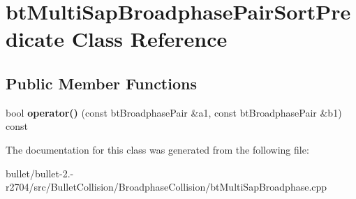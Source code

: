 \hypertarget{classbt_multi_sap_broadphase_pair_sort_predicate}{\section{bt\+Multi\+Sap\+Broadphase\+Pair\+Sort\+Predicate Class Reference}
\label{classbt_multi_sap_broadphase_pair_sort_predicate}
}
\subsection*{Public Member Functions}
\begin{DoxyCompactItemize}
\item 
\hypertarget{classbt_multi_sap_broadphase_pair_sort_predicate_ae034779b942c257b596baff0543bbf5d}{bool {\bfseries operator()} (const bt\+Broadphase\+Pair \&a1, const bt\+Broadphase\+Pair \&b1) const }\label{classbt_multi_sap_broadphase_pair_sort_predicate_ae034779b942c257b596baff0543bbf5d}

\end{DoxyCompactItemize}


The documentation for this class was generated from the following file\+:\begin{DoxyCompactItemize}
\item 
bullet/bullet-\/2.-\/r2704/src/\+Bullet\+Collision/\+Broadphase\+Collision/bt\+Multi\+Sap\+Broadphase.\+cpp\end{DoxyCompactItemize}
